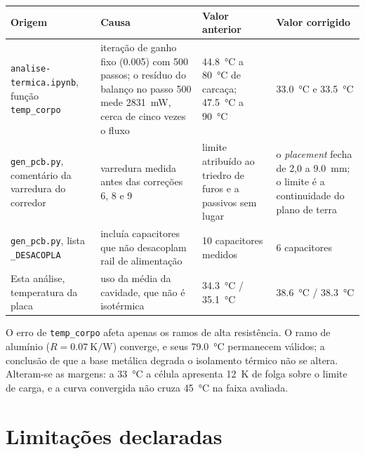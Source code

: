 \documentclass[10pt,a4paper,landscape]{article}
\newcommand{\arq}[1]{\texttt{#1}}
\begin{document}
\begin{table}[H]\footnotesize
\begin{tabularx}{\textwidth}{@{}Y{0.952} Y{1.238} Y{0.857} Y{0.952}@{}}
\toprule
\textbf{Origem} & \textbf{Causa} & \textbf{Valor anterior} & \textbf{Valor corrigido} \\
\midrule
\arq{analise-termica.ipynb}, função \texttt{temp\_corpo} & iteração de ganho fixo (\num{0.005}) com 500 passos; o resíduo do balanço no passo 500 mede \SI{2831}{\milli\watt}, cerca de cinco vezes o fluxo & \SI{44.8}{\celsius} a \SI{80}{\celsius} de carcaça; \SI{47.5}{\celsius} a \SI{90}{\celsius} & \SI{33.0}{\celsius} e \SI{33.5}{\celsius} \\
\texttt{gen\_pcb.py}, comentário da varredura do corredor & varredura medida antes das correções 6, 8 e 9 & limite atribuído ao triedro de furos e a passivos sem lugar & o \emph{placement} fecha de 2,0 a \SI{9.0}{\milli\meter}; o limite é a continuidade do plano de terra \\
\texttt{gen\_pcb.py}, lista \texttt{\_DESACOPLA} & incluía capacitores que não desacoplam rail de alimentação & 10 capacitores medidos & 6 capacitores \\
Esta análise, temperatura da placa & uso da média da cavidade, que não é isotérmica & \SI{34.3}{\celsius} / \SI{35.1}{\celsius} & \SI{38.6}{\celsius} / \SI{38.3}{\celsius} \\
\bottomrule
\end{tabularx}
\end{table}

O erro de \texttt{temp\_corpo} afeta apenas os ramos de alta resistência. O ramo de alumínio ($R=\SI{0.07}{\kelvin\per\watt}$) converge, e seus \SI{79.0}{\celsius} permanecem válidos; a conclusão de que a base metálica degrada o isolamento térmico não se altera. Alteram-se as margens: a \SI{33}{\celsius} a célula apresenta \SI{12}{\kelvin} de folga sobre o limite de carga, e a curva convergida não cruza \SI{45}{\celsius} na faixa avaliada.

\section{Limitações declaradas}
\end{document}
